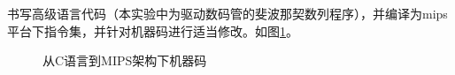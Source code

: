 \documentclass[UTF8]{article}
\begin{document}
书写高级语言代码（本实验中为驱动数码管的斐波那契数列程序），并编译为mips平台下指令集，并针对机器码进行适当修改。如图\ref{FIG6}。
\begin{figure}[H]
    \centering
    \caption{从C语言到MIPS架构下机器码}
    \label{FIG6}
\end{figure}
\end{document}
